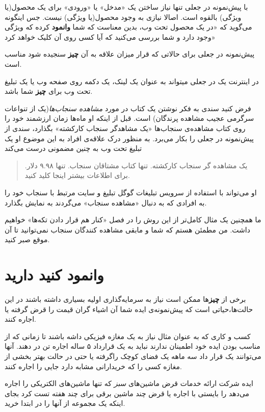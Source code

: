 با پیش‌نمونه در جعلی تنها نیاز ساختن یک «مدخل» یا «ورودی» برای یک
محصول(یا ویژگی) بالقوه است. اصالا نیازی به وجود محصول(یا ویژگی) نیست. جس
اینگونه می‌گوید که «در یک محصول تحت وب، بدین معناست که شما
\textbf{وانمود} کرده که ویژگی وجود دارد و شما بررسی می‌کنید که آیا کسی
روی آن کلیک خواهد کرد»

پیش‌نمونه در جعلی برای حالاتی که قرار میزان علاقه به آن \textbf{چیز}
سنجیده شود مناسب است.

در اینترنت یک در جعلی میتواند به عنوان یک لینک، یک دکمه روی صفحه وب یا
یک تبلیغ تحت وب برای \textbf{چیز} شما باشد.

فرض کنید سندی به فکر نوشتن یک کتاب در مورد \emph{مشاهده سنجاب‌ها}(یک از
تنواعات سرگرمی عجیب مشاهده پرندگان) است. قبل از اینکه او ماه‌ها زمان
ارزشمند خود را روی کتاب مشاهده‌ی سنجاب‌ها «یک مشاهدگر سنجاب کارکشته»
بگذارد، سندی از پیش‌نمونه در جعلی را بکار می‌برد. به منظور درک علاقه‌ی
افراد به این موضوع او یک تبلیغ تحت وب به چنین مضمونی درست می‌کند

\begin{quote}
یک مشاهده گر سنجاب کارکشته. تنها کتاب مشتاقان سنجاب. تنها ۹.۹۸ دلار.
برای اطلاعات بیشتر اینجا کلید کنید.
\end{quote}

او می‌تواند با استفاده از سرویس تبلیغات گوگل تبلیغ و سایت مرتبط با سنجاب
خود را به افرادی که به دنبال «مشاهده سنجاب» می‌گردند به نمایش بگذارد.

ما همچنین یک مثال کامل‌تر از این روش را در فصل «کنار هم قرار دادن
تکه‌ها» خواهیم داشت. من مطمئن هستم که شما و مابقی مشاهده کنندگان سنجاب
نمی‌توانید تا آن موقع صبر کنید.

\section{وانمود کنید
دارید}\label{ux648ux627ux646ux645ux648ux62f-ux6a9ux646ux6ccux62f-ux62fux627ux631ux6ccux62f}

برخی از \textbf{چیز}ها ممکن است نیاز به سرمایه‌گذاری اولیه بسیاری داشته
باشند در این حالت‌ها،حیاتی است که پیش‌نمونه‌ی ایده شما آن اشیاء گران
قیمت را قرض گرفته یا اجاره کنند.

کسب و کاری که به عنوان مثال نیاز به یک مغازه فیزیکی داشه باشند تا زمانی
که از مناسب بودن ایده خود اطمینان ندارند نباید به یک قرارداد ۵ ساله
اجاره تن در دهند. آنها می‌توانند یک قرار داد سه ماهه یک فضای کوچک
راگرفته یا حتی در حالت بهتر بخشی از مغازه کسی را که خریدارانی مشابه دارد
جایی را اجاره کنند.

ایده شرکت ارائه خدمات قرض ماشین‌های \emph{سبز} که تنها ماشین‌های
الکتریکی را اجاره می‌دهد را بایستی با اجاره یا قرض چند ماشین برقی برای
چند هفته تست کرد بجای اینکه یک مجموعه از آنها را در ابتدا خرید.

